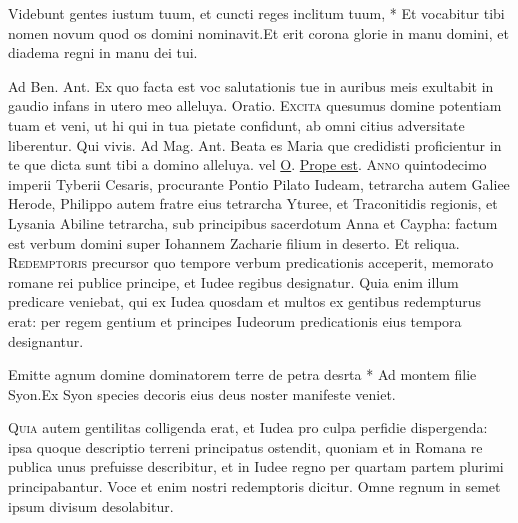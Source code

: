 \begin{multicols*}{2}
\begin{responsory-doxology}
{Videbunt gentes iustum tuum, et cuncti reges inclitum tuum, * Et vocabitur tibi nomen novum quod os domini nominavit.}{Et erit corona glorie in manu domini, et diadema regni in manu dei tui.}
\end{responsory-doxology}
{\color{Red} Ad Ben. Ant.} Ex quo facta est voc salutationis tue in auribus meis exultabit in gaudio infans in utero meo alleluya. {\color{Red} Oratio.}
\lettrine[lines=2]{\zallmancaps \color{Blue} E}{xcita} quesumus domine potentiam tuam et veni, ut hi qui in tua pietate confidunt, ab omni citius adversitate liberentur. Qui vivis. {\color{Red} Ad Mag. Ant.} Beata es Maria que credidisti proficientur in te que dicta sunt tibi a domino alleluya. {\color{Red} vel} \hyperlink{o-antiphons}{O}.
 \hyperlink{prope-est-iam-invitatorium}{Prope est}.
\lettrine[lines=2]{\zallmancaps \color{Red} A}{nno} quintodecimo imperii Tyberii Cesaris, procurante Pontio Pilato Iudeam, tetrarcha autem Galiee Herode, Philippo autem fratre eius tetrarcha Yturee, et Traconitidis regionis, et Lysania Abiline tetrarcha, sub principibus sacerdotum Anna et Caypha: factum est verbum domini super Iohannem Zacharie filium in deserto. Et reliqua.
\lettrine[lines=2]{\zallmancaps \color{Blue} R}{edemptoris} precursor quo tempore verbum predicationis acceperit, memorato romane rei publice principe, et Iudee regibus designatur. Quia enim illum predicare veniebat, qui ex Iudea quosdam et multos ex gentibus redempturus erat: per regem gentium et principes Iudeorum predicationis eius tempora designantur.
\begin{responsory}
{Emitte agnum domine dominatorem terre de petra desrta * Ad montem filie Syon.}{Ex Syon species decoris eius deus noster manifeste veniet.}
\end{responsory}
\lettrine[lines=2]{\zallmancaps \color{Red} Q}{uia} autem gentilitas colligenda erat, et Iudea pro culpa perfidie dispergenda: ipsa quoque descriptio terreni principatus ostendit, quoniam et in Romana re publica unus prefuisse describitur, et in Iudee regno per quartam partem plurimi principabantur. Voce et enim nostri redemptoris dicitur. Omne regnum in semet ipsum divisum desolabitur.

\end{multicols*}
